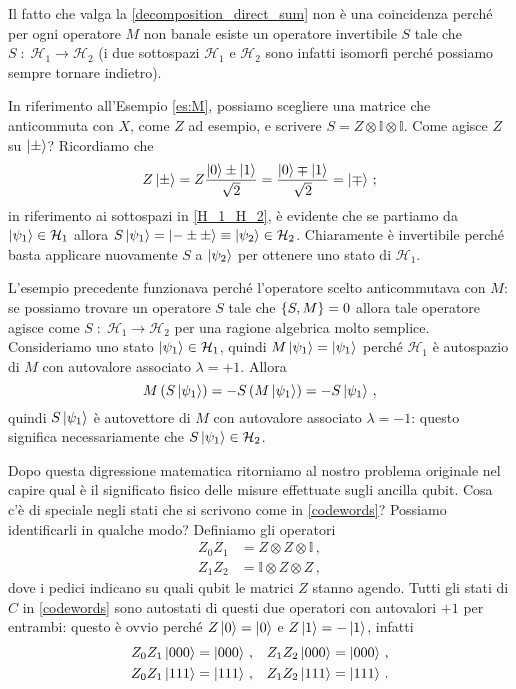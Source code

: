 \noindent Il fatto che valga la \eqref{decomposition_direct_sum} non è una coincidenza perché per ogni operatore $M$ non banale esiste un operatore invertibile $S$ tale che $S \; : \; \mathcal{H}_1 \to \mathcal{H}_2$ (i due sottospazi $\mathcal{H}_1$ e $\mathcal{H}_2$ sono infatti isomorfi perché possiamo sempre tornare indietro). 

\begin{esempio}
    In riferimento all'Esempio \ref{es:M}, possiamo scegliere una matrice che anticommuta con $X$, come $Z$ ad esempio, e scrivere $S = Z \otimes \mathbb{I} \otimes \mathbb{I}$. Come agisce $Z$ su $\ket{\pm}$? Ricordiamo che
    \begin{equation*}
        Z \ket{\pm} = Z \frac{\ket{0} \pm \ket{1}}{\sqrt{2}} = \frac{\ket{0} \mp \ket{1}}{\sqrt{2}} = \ket{\mp} \, ;
    \end{equation*}
    in riferimento ai sottospazi in \eqref{H_1_H_2}, è evidente che se partiamo da $\ket{\psi_1} \in \mathcal{H}_1$ allora $S \ket{\psi_1} = \ket{- \pm \pm} \equiv \ket{\psi_2} \in \mathcal{H}_2$. Chiaramente è invertibile perché basta applicare nuovamente $S$ a $\ket{\psi_2}$ per ottenere uno stato di $\mathcal{H}_1$. 
\end{esempio}

\noindent L'esempio precedente funzionava perché l'operatore scelto anticommutava con $M$: se possiamo trovare un operatore $S$ tale che $\acomm{S}{M} = 0$ allora tale operatore agisce come $S \; : \; \mathcal{H}_1 \to \mathcal{H}_2$ per una ragione algebrica molto semplice. Consideriamo uno stato $\ket{\psi_1} \in \mathcal{H}_1$, quindi $M \ket{\psi_1} = \ket{\psi_1}$ perché $\mathcal{H}_1$ è autospazio di $M$ con autovalore associato $\lambda = +1$. Allora
\begin{equation*}
    M \left( S \ket{\psi_1} \right) = - S \left( M \ket{\psi_1} \right) = - S \ket{\psi_1} \, ,
\end{equation*}
quindi $S \ket{\psi_1}$ è autovettore di $M$ con autovalore associato $\lambda = -1$: questo significa necessariamente che $S \ket{\psi_1} \in \mathcal{H}_2$.

\noindent Dopo questa digressione matematica ritorniamo al nostro problema originale nel capire qual è il significato fisico delle misure effettuate sugli ancilla qubit. Cosa c'è di speciale negli stati che si scrivono come in \eqref{codewords}? Possiamo identificarli in qualche modo? Definiamo gli operatori
\begin{align*}
    Z_0 Z_1 &= Z \otimes Z \otimes \mathbb{I} \, , \\
    Z_1 Z_2 &= \mathbb{I} \otimes Z \otimes Z \, ,
\end{align*}
dove i pedici indicano su quali qubit le matrici $Z$ stanno agendo. Tutti gli stati di $C$ in \eqref{codewords} sono autostati di questi due operatori con autovalori $+1$ per entrambi: questo è ovvio perché $Z \ket{0} = \ket{0}$ e $Z \ket{1} = - \ket{1}$, infatti
\begin{align*}
    Z_0 Z_1 \ket{000} &= \ket{000} \, , & Z_1 Z_2 \ket{000} &= \ket{000} \, , \\
    Z_0 Z_1 \ket{111} &= \ket{111} \, , & Z_1 Z_2 \ket{111} &= \ket{111} \, .
\end{align*}

